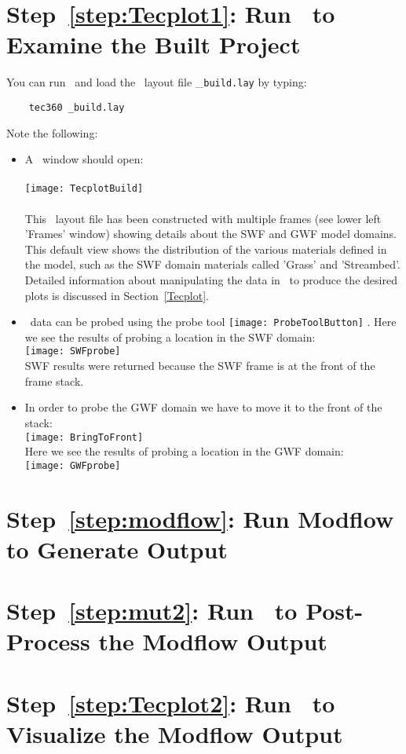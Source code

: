 \section*{Step~\ref{step:Tecplot1}: Run \tecplot\ to Examine the Built Project}
You can run \tecplot\ and load the \tecplot\ layout file \_\verb+build.lay+ by typing:
\begin{verbatim}
    tec360 _build.lay
\end{verbatim}
Note the following:
\begin{itemize}
    \item A \tecplot\ window should open: \\ \\
        \texttt{[image: TecplotBuild]} \\ \\
    This \tecplot\ layout file has been constructed with multiple frames (see lower left 'Frames' window) showing details about the SWF and GWF model domains. This default view shows the distribution of the various materials defined in the model, such as the SWF domain materials called 'Grass' and 'Streambed'.  Detailed information about manipulating the data in \tecplot\ to produce the desired plots is discussed in Section~\ref{Tecplot}.
    \item \tecplot\ data can be probed using the probe tool \texttt{[image: ProbeToolButton]} .  Here we see the results of probing a location in the SWF domain: \\
        \texttt{[image: SWFprobe]} \\
        SWF results were returned because the SWF frame is at the front of the frame stack.
    \item In order to probe the GWF domain we have to move it to the front of the stack: \\
            \texttt{[image: BringToFront]} \\
          Here we see the results of probing a location in the GWF domain: \\
            \texttt{[image: GWFprobe]} \\

\end{itemize}



\section*{Step~\ref{step:modflow}: Run Modflow to Generate Output}
\section*{Step~\ref{step:mut2}: Run \mut\ to Post-Process the Modflow Output}
\section*{Step~\ref{step:Tecplot2}: Run \tecplot\ to Visualize the Modflow Output}

